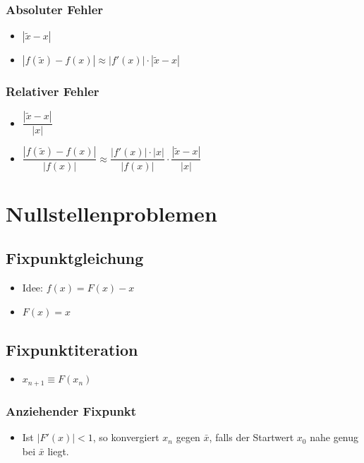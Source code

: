 \documentclass[8pt,a4paper]{scrartcl}
\begin{document}
\begin{multicols*}{3}
\begin{itemize}
				\end{itemize}		
		
    			\subsubsection{Absoluter Fehler}
    				\begin{itemize}\itemsep0pt			
    					\item $|\tilde{x} - x|$	
					\item $|f(\tilde{x})-f(x)|\approx |f'(x)|\cdot |\tilde{x} - x|$
				\end{itemize}
			\subsubsection{Relativer Fehler}	
				\begin{itemize}\itemsep0pt	
					\item $\dfrac{|\tilde{x} - x|}{|x|}$
					\item $\dfrac{|f(\tilde{x})-f(x)|}{|f(x)|}\approx \dfrac{|f'(x)|\cdot |x|}{|f(x)|} \cdot \dfrac{|\tilde{x} - x|}{|x|}$
				\end{itemize}
   
	\section{Nullstellenproblemen}
		\subsection{Fixpunktgleichung}
			\begin{itemize}\itemsep0pt	
				\item Idee: $f(x) = F(x) - x$
				\item $F(x) = x$
			\end{itemize}
		\subsection{Fixpunktiteration}
			\begin{itemize}\itemsep0pt	
				\item $x_{n+1} \equiv F(x_{n})$
			\end{itemize}
			\subsubsection{Anziehender Fixpunkt}
				\begin{itemize}\itemsep0pt	
					\item Ist $|F'(x)| < 1$, so konvergiert $x_{n}$ gegen $\bar{x}$, falls der Startwert $x_{0}$ nahe genug bei $\bar{x}$ liegt.
				\end{itemize}

\end{multicols*}
\end{document}
